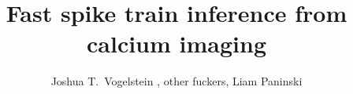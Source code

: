  
\newcommand{\zzz}{z}
\newcommand{\xT}{\ve{C}}
\newcommand{\yT}{\ve{y}}
\newcommand{\nT}{\ve{n}}
\newcommand{\zT}{\ve{n}}
\newcommand{\FT}{\ve{F}}
\newcommand{\lT}{\ve{\lam}}
\newcommand{\wX}{\widehat{\ve{C}}}
\newcommand{\wY}{\widehat{\ve{Y}}}
\newcommand{\CaT}{\Cav}
\newcommand{\ax}{\argmax_{\ve{C}_t \geq 0 \forall t}}
\newcommand{\an}{\argmin_{n_t \geq 0 \forall t}}
\newcommand{\az}{\argmin_{\bM \bC \geq \ve{0}}}
\newcommand{\ath}{\argmax_{\bth \in \ve{\Theta}}}
\newcommand{\ann}{\argmin_{n_t \in \mathbb{N}_0 \forall t}}
\newcommand{\hnm}{\widehat{\bn}}
\newcommand{\hCm}{\widehat{\bC}}



\title{Fast spike train inference from calcium imaging}

\author{
Joshua T.~Vogelstein%
, other fuckers, Liam Paninski\\
}



